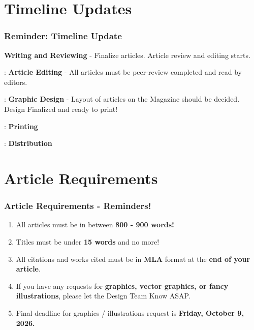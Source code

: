 \documentclass{beamer}
\begin{document}
\section{Timeline Updates}
\begin{frame}
    \frametitle{Reminder: Timeline Update}

        \begin{description}
            \item<1->[September 30 to October 14] \textbf{Writing and Reviewing} - Finalize articles. Article review and editing starts.

            \item<2->[October 14 to October 18]: \textbf{Article Editing} - All articles must be peer-review completed and read by editors.

            \item<3->[October 18 to October 25]: \textbf{Graphic Design} - Layout of articles on the Magazine should be decided. Design Finalized and ready to print! 

            \item<4->[October 26 to October 30]: \textbf{Printing}

            \item<5->[November 2 to November 20]: \textbf{Distribution} 
        \end{description}   
\end{frame}

\section{Article Requirements}
\begin{frame}
    \frametitle{Article Requirements - Reminders!} 

    \begin{enumerate}
        \item<1-> All articles must be in between \textbf{800 - 900 words!} 

        \item<2-> Titles must be under \textbf{15 words} and no more!

        \item<3-> All citations and works cited must be in \textbf{MLA} format at the \textbf{end of your article}. 

        \item<4-> If you have any requests for \textbf{graphics, vector graphics, or fancy illustrations}, please let the Design Team Know ASAP. 

        \item<5-> Final deadline for graphics / illustrations request is \textbf{Friday, October 9, 2026.}

    \end{enumerate}
    
\end{frame}
\end{document}
